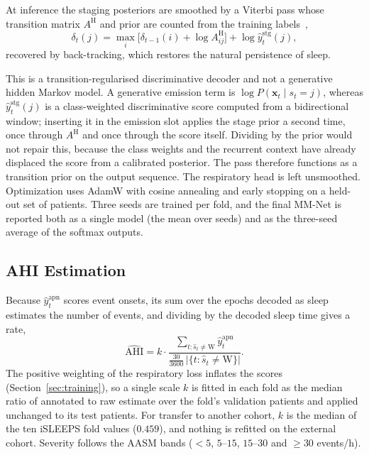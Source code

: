 \documentclass[a4paper,fleqn]{cas-sc}
\begin{document}
At inference the staging
posteriors are smoothed by a Viterbi pass whose transition matrix $A^{\mathrm H}$
and prior are counted from the training labels~\cite{chen2024hmm},
\begin{equation}
\delta_t(j)=\max_i\big[\delta_{t-1}(i)+\log A^{\mathrm H}_{ij}\big]+\log\hat y^{\mathrm{stg}}_t(j),
\end{equation}
recovered by back-tracking, which restores the natural persistence of sleep.

This is a transition-regularised discriminative decoder and not a generative hidden Markov
model. A generative emission term is
$\log P(\mathbf{x}_t\mid s_t=j)$, whereas $\hat y^{\mathrm{stg}}_t(j)$ is a class-weighted
discriminative score computed from a bidirectional window; inserting it in the emission slot
applies the stage prior a second time, once through $A^{\mathrm H}$ and once through the
score itself. Dividing by the prior would not repair this, because the class weights and the recurrent context have already displaced the score from a calibrated posterior.
The pass therefore functions as a transition prior on the output sequence. The respiratory
head is left unsmoothed. Optimization uses AdamW with cosine annealing and early stopping on a
held-out set of patients. Three seeds are trained per fold, and the final MM-Net is reported
both as a single model (the mean over seeds) and as the three-seed average of the softmax
outputs.

\subsection{AHI Estimation}
\label{sec:ahimethod}
Because $\hat y^{\mathrm{apn}}_t$ scores event onsets, its sum over the epochs decoded as sleep
estimates the number of events, and dividing by the decoded sleep time gives a rate,
\begin{equation}
\widehat{\mathrm{AHI}}=k\cdot\frac{\sum_{t:\hat s_t\neq\mathrm{W}}\hat y^{\mathrm{apn}}_t}{\tfrac{30}{3600}\,\lvert\{t:\hat s_t\neq\mathrm{W}\}\rvert}.
\end{equation}
The positive weighting of the respiratory loss inflates the scores
(Section~\ref{sec:training}), so a single scale $k$ is fitted in each fold as the median ratio
of annotated to raw estimate over the fold's validation patients and applied unchanged to its
test patients. For transfer to another cohort, $k$ is the median of the ten iSLEEPS fold
values ($0.459$), and nothing is refitted on the external cohort. Severity follows the AASM
bands ($<5$, $5$--$15$, $15$--$30$ and $\geq30$ events/h).
\end{document}
